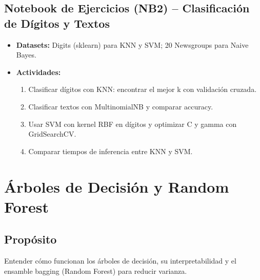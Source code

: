 \documentclass[12pt,a4paper]{article}
\begin{document}
\subsection*{Notebook de Ejercicios (NB2) – Clasificación de Dígitos y Textos}
\begin{itemize}
    \item \textbf{Datasets:} Digits (sklearn) para KNN y SVM; 20 Newsgroups para Naive Bayes.
    \item \textbf{Actividades:}
    \begin{enumerate}
        \item Clasificar dígitos con KNN: encontrar el mejor k con validación cruzada.
        \item Clasificar textos con MultinomialNB y comparar accuracy.
        \item Usar SVM con kernel RBF en dígitos y optimizar C y gamma con GridSearchCV.
        \item Comparar tiempos de inferencia entre KNN y SVM.
    \end{enumerate}
\end{itemize}

\section{Árboles de Decisión y Random Forest}
\subsection*{Propósito}
Entender cómo funcionan los árboles de decisión, su interpretabilidad y el ensamble bagging (Random Forest) para reducir varianza.
\end{document}
